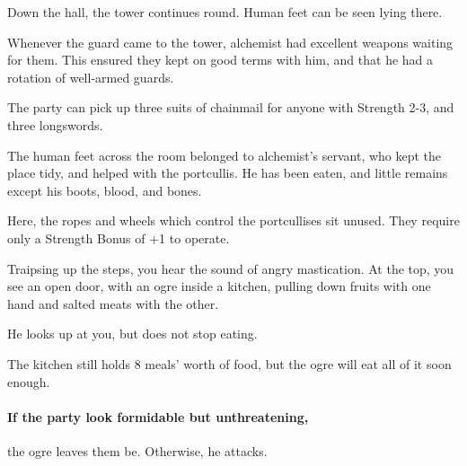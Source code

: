 \begin{multicols}{2}
\begin{boxtext}
  Down the hall, the tower continues round.
  Human feet can be seen lying there.

\end{boxtext}


\begin{exampletext}
  Whenever the \gls{guard} came to the tower, \gls{alchemist} had excellent weapons waiting for them.
  This ensured they kept on good terms with him, and that he had a rotation of well-armed guards.
\end{exampletext}


The party can pick up three suits of chainmail for anyone with Strength 2-3, and three longswords.

The human feet across the room belonged to \gls{alchemist}'s servant, who kept the place tidy, and helped with the portcullis.
He has been eaten, and little remains except his boots, blood, and bones.


Here, the ropes and wheels which control the portcullises sit unused.
They require only a Strength Bonus of +1 to operate.

\begin{boxtext}
  Traipsing up the steps, you hear the sound of angry mastication.
  At the top, you see an open door, with an ogre inside a kitchen, pulling down fruits with one hand and salted meats with the other.

  He looks up at you, but does not stop eating.
\end{boxtext}


The kitchen still holds 8 meals' worth of food, but the ogre will eat all of it soon enough.

\paragraph{If the party look formidable but unthreatening,}
the ogre leaves them be.
Otherwise, he attacks.



\end{multicols}

